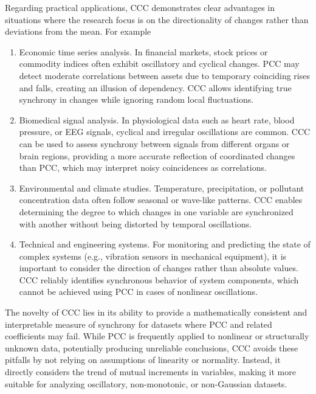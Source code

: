 \documentclass[aos]{imsart}
\begin{document}
Regarding practical applications, CCC demonstrates clear advantages in situations where the research focus is on the directionality of changes rather than deviations from the mean. For example
\begin{enumerate}
\item Economic time series analysis. In financial markets, stock prices or commodity indices often exhibit oscillatory and cyclical changes. PCC may detect moderate correlations between assets due to temporary coinciding rises and falls, creating an illusion of dependency. CCC allows identifying true synchrony in changes while ignoring random local fluctuations.

\item Biomedical signal analysis. In physiological data such as heart rate, blood pressure, or EEG signals, cyclical and irregular oscillations are common. CCC can be used to assess synchrony between signals from different organs or brain regions, providing a more accurate reflection of coordinated changes than PCC, which may interpret noisy coincidences as correlations.

\item Environmental and climate studies. Temperature, precipitation, or pollutant concentration data often follow seasonal or wave-like patterns. CCC enables determining the degree to which changes in one variable are synchronized with another without being distorted by temporal oscillations.

\item Technical and engineering systems. For monitoring and predicting the state of complex systems (e.g., vibration sensors in mechanical equipment), it is important to consider the direction of changes rather than absolute values. CCC reliably identifies synchronous behavior of system components, which cannot be achieved using PCC in cases of nonlinear oscillations.
\end{enumerate}

The novelty of CCC lies in its ability to provide a mathematically consistent and interpretable measure of synchrony for datasets where PCC and related coefficients may fail. While PCC is frequently applied to nonlinear or structurally unknown data, potentially producing unreliable conclusions, CCC avoids these pitfalls by not relying on assumptions of linearity or normality. Instead, it directly considers the trend of mutual increments in variables, making it more suitable for analyzing oscillatory, non-monotonic, or non-Gaussian datasets.
\end{document}
